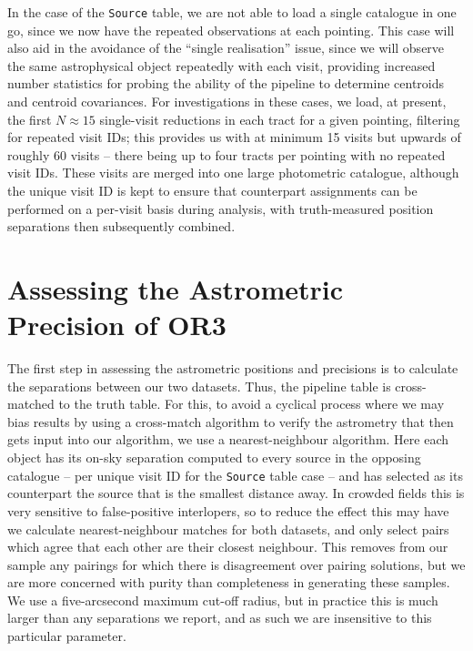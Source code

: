 \documentclass[SE,lsstdraft,authoryear,toc]{lsstdoc}
\begin{document}
In the case of the \texttt{Source} table, we are not able to load a single catalogue in one go, since we now have the repeated observations at each pointing.
This case will also aid in the avoidance of the ``single realisation'' issue, since we will observe the same astrophysical object repeatedly with each visit, providing increased number statistics for probing the ability of the pipeline to determine centroids and centroid covariances.
For investigations in these cases, we load, at present, the first $N \approx 15$ single-visit reductions in each tract for a given pointing, filtering for repeated visit IDs; this provides us with at minimum 15 visits but upwards of roughly 60 visits -- there being up to four tracts per pointing with no repeated visit IDs.
These visits are merged into one large photometric catalogue, although the unique visit ID is kept to ensure that counterpart assignments can be performed on a per-visit basis during analysis, with truth-measured position separations then subsequently combined.

\section{Assessing the Astrometric Precision of OR3}
The first step in assessing the astrometric positions and precisions is to calculate the separations between our two datasets.
Thus, the pipeline table is cross-matched to the truth table.
For this, to avoid a cyclical process where we may bias results by using a cross-match algorithm to verify the astrometry that then gets input into our algorithm, we use a nearest-neighbour algorithm.
Here each object has its on-sky separation computed to every source in the opposing catalogue -- per unique visit ID for the \texttt{Source} table case -- and has selected as its counterpart the source that is the smallest distance away.
In crowded fields this is very sensitive to false-positive interlopers, so to reduce the effect this may have we calculate nearest-neighbour matches for both datasets, and only select pairs which agree that each other are their closest neighbour.
This removes from our sample any pairings for which there is disagreement over pairing solutions, but we are more concerned with purity than completeness in generating these samples.
We use a five-arcsecond maximum cut-off radius, but in practice this is much larger than any separations we report, and as such we are insensitive to this particular parameter.
\end{document}
